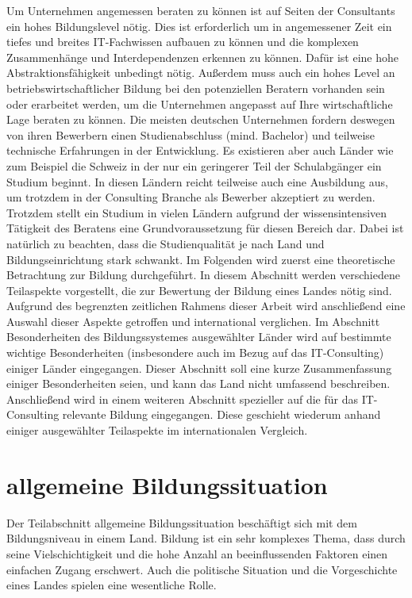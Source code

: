 Um Unternehmen angemessen beraten zu können ist auf Seiten der Consultants ein hohes Bildungslevel nötig. Dies ist erforderlich um in angemessener Zeit ein tiefes und breites IT-Fachwissen aufbauen zu können und die komplexen Zusammenhänge und Interdependenzen erkennen zu können. Dafür ist eine hohe Abstraktionsfähigkeit unbedingt nötig. Außerdem muss auch ein hohes Level an betriebswirtschaftlicher Bildung bei den potenziellen Beratern vorhanden sein oder erarbeitet werden, um die Unternehmen angepasst auf Ihre wirtschaftliche Lage beraten zu können.
Die meisten deutschen Unternehmen fordern deswegen von ihren Bewerbern einen Studienabschluss (mind. Bachelor) und teilweise technische Erfahrungen in der Entwicklung. Es existieren aber auch Länder wie zum Beispiel die Schweiz in der nur ein geringerer Teil der Schulabgänger ein Studium beginnt. In diesen Ländern reicht teilweise auch eine Ausbildung aus, um trotzdem in der Consulting Branche als Bewerber akzeptiert zu werden.
Trotzdem stellt ein Studium in vielen Ländern aufgrund der wissensintensiven Tätigkeit des Beratens eine Grundvoraussetzung für diesen Bereich dar. Dabei ist natürlich zu beachten, dass die Studienqualität je nach Land und Bildungseinrichtung stark schwankt.
Im Folgenden wird zuerst eine theoretische Betrachtung zur Bildung durchgeführt. In diesem Abschnitt werden verschiedene Teilaspekte vorgestellt, die zur Bewertung der Bildung eines Landes nötig sind. Aufgrund des begrenzten zeitlichen Rahmens dieser Arbeit wird anschließend eine Auswahl dieser Aspekte getroffen und international verglichen.
 Im Abschnitt Besonderheiten des Bildungssystemes ausgewählter Länder wird auf bestimmte wichtige Besonderheiten (insbesondere auch im Bezug auf das IT-Consulting) einiger Länder eingegangen. Dieser Abschnitt soll eine kurze Zusammenfassung einiger Besonderheiten seien, und kann das Land nicht umfassend beschreiben.
 Anschließend wird in einem weiteren Abschnitt spezieller auf die für das IT-Consulting relevante Bildung eingegangen. Diese geschieht wiederum anhand einiger ausgewählter Teilaspekte im internationalen Vergleich.


\section{allgemeine Bildungssituation}
Der Teilabschnitt allgemeine Bildungssituation beschäftigt sich mit dem Bildungsniveau in einem Land. Bildung ist ein sehr komplexes Thema, dass durch seine Vielschichtigkeit und die hohe Anzahl an beeinflussenden Faktoren einen einfachen Zugang erschwert. Auch die politische Situation und die Vorgeschichte eines Landes spielen eine wesentliche Rolle.

